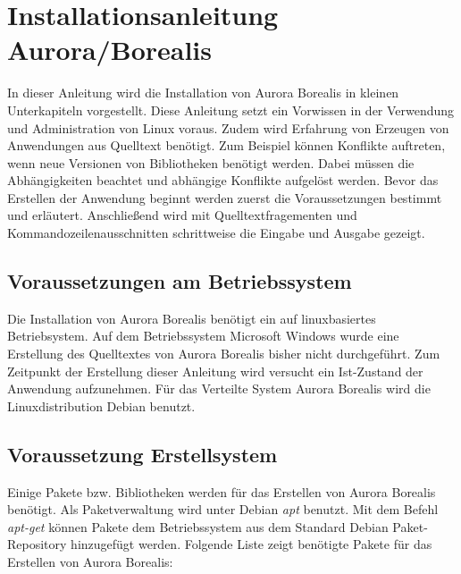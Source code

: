 \section{Installationsanleitung Aurora/Borealis}
\label{sec:aurborinstall}


In dieser Anleitung wird die Installation von Aurora Borealis in kleinen Unterkapiteln vorgestellt. Diese Anleitung setzt ein Vorwissen in der Verwendung und Administration von Linux voraus. Zudem wird Erfahrung von Erzeugen von Anwendungen aus Quelltext benötigt. Zum Beispiel können Konflikte auftreten, wenn neue Versionen von Bibliotheken benötigt werden. Dabei müssen die Abhängigkeiten beachtet und abhängige Konflikte aufgelöst werden. Bevor das Erstellen der Anwendung beginnt werden zuerst die Voraussetzungen bestimmt und erläutert. Anschließend wird mit Quelltextfragementen und Kommandozeilenausschnitten schrittweise die Eingabe und Ausgabe gezeigt.


\subsection{Voraussetzungen am Betriebssystem}

Die Installation von Aurora Borealis benötigt ein auf linuxbasiertes Betriebsystem. Auf dem Betriebssystem Microsoft Windows wurde eine Erstellung des Quelltextes von Aurora Borealis bisher nicht durchgeführt. Zum Zeitpunkt der Erstellung dieser Anleitung wird versucht ein Ist-Zustand der Anwendung aufzunehmen. Für das Verteilte System Aurora Borealis wird die Linuxdistribution Debian benutzt.


\subsection{Voraussetzung Erstellsystem}

Einige Pakete bzw. Bibliotheken werden für das Erstellen von Aurora Borealis benötigt. Als Paketverwaltung wird unter Debian \textit{apt} benutzt. Mit dem Befehl \textit{apt-get} können Pakete dem Betriebssystem aus dem Standard Debian Paket-Repository hinzugefügt werden. Folgende Liste zeigt benötigte Pakete für das Erstellen von Aurora Borealis:

